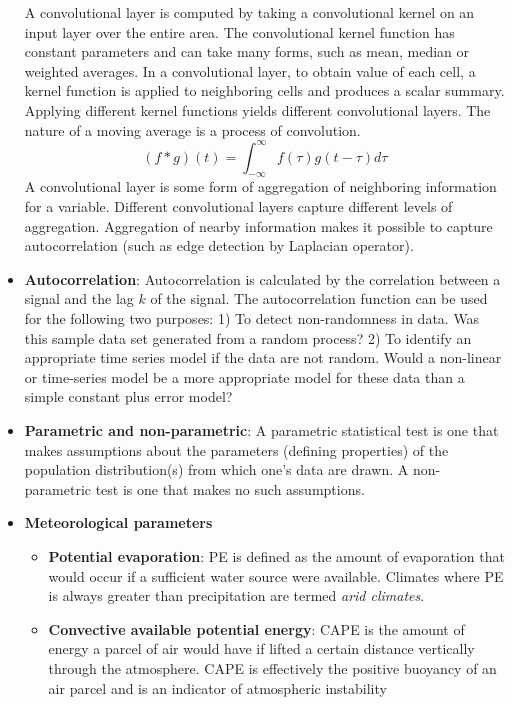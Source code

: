 \documentclass{article}
\begin{document}
\begin{itemize}
{    A convolutional layer is computed by taking a convolutional kernel on an input layer over the entire area. The convolutional kernel function has constant parameters and can take many forms, such as mean, median or weighted averages. In a convolutional layer, to obtain value of each cell, a kernel function is applied to neighboring cells and produces a scalar summary. Applying different kernel functions yields different convolutional layers. The nature of a moving average is a process of convolution. 
    \begin{equation*}
        (f*g)(t)=\int_{-\infty}^{\infty}f(\tau)g(t-\tau)d\tau
    \end{equation*}
    A convolutional layer is some form of aggregation of neighboring information for a variable. Different convolutional layers capture different levels of aggregation. Aggregation of nearby information makes it possible to capture autocorrelation (such as edge detection by Laplacian operator). 
    }
    \item \textbf{Autocorrelation}: Autocorrelation is calculated by the correlation between a signal and the lag $k$ of the signal. The autocorrelation function can be used for the following two purposes: 1) To detect non-randomness in data. Was this sample data set generated from a random process? 2) To identify an appropriate time series model if the data are not random. Would a non-linear or time-series model be a more appropriate model for these data than a simple constant plus error model?
    \item \textbf{Parametric and non-parametric}: A parametric statistical test is one that makes assumptions about the parameters (defining properties) of the population distribution(s) from which one's data are drawn. A non-parametric test is one that makes no such assumptions. 
    \item \textbf{Meteorological parameters} {
        \begin{itemize}
            \item \textbf{Potential evaporation}: PE is defined as the amount of evaporation that would occur if a sufficient water source were available. Climates where PE is always greater than precipitation are termed \textit{arid climates}.
            \item \textbf{Convective available potential energy}: CAPE is the amount of energy a parcel of air would have if lifted a certain distance vertically through the atmosphere. CAPE is effectively the positive buoyancy of an air parcel and is an indicator of atmospheric instability

\end{itemize}}
\end{itemize}
\end{document}
